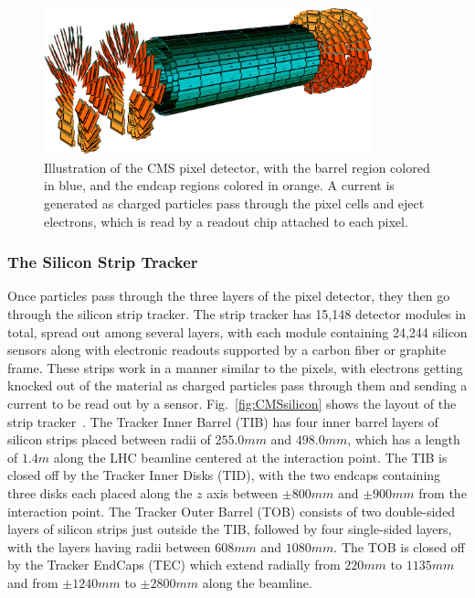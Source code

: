 \begin{figure}[htbp]
  \centering
  \includegraphics[width=0.85\textwidth]{fig/experiment/cms_pixelTracker.pdf}
  \caption{
    Illustration of the CMS pixel detector, with the barrel region colored in blue, and the endcap regions colored in orange.
    A current is generated as charged particles pass through the pixel cells and eject electrons, which is read by a readout chip attached to each pixel.
  }
  \label{fig:CMSpixel}
\end{figure}

\subsubsection{The Silicon Strip Tracker}

Once particles pass through the three layers of the pixel detector, they then go through the silicon strip tracker.
The strip tracker has 15,148 detector modules in total, spread out among several layers, with each module containing 24,244 silicon sensors along with electronic readouts supported by a carbon fiber or graphite frame. %
These strips work in a manner similar to the pixels, with electrons getting knocked out of the material as charged particles pass through them and sending a current to be read out by a sensor.
Fig.~\ref{fig:CMSsilicon} shows the layout of the strip tracker~\cite{Chatrchyan:1211825}.
The Tracker Inner Barrel (TIB) has four inner barrel layers of silicon strips placed between radii of $255.0\unit{mm}$ and $498.0\unit{mm}$, which has a length of $1.4\unit{m}$ along the LHC beamline centered at the interaction point.
The TIB is closed off by the Tracker Inner Disks (TID), with the two endcaps containing three disks each placed along the $z$ axis between $\pm800\unit{mm}$ and $\pm900\unit{mm}$ from the interaction point.
The Tracker Outer Barrel (TOB) consists of two double-sided layers of silicon strips just outside the TIB, followed by four single-sided layers, with the layers having radii between $608\unit{mm}$ and $1080\unit{mm}$.
The TOB is closed off by the Tracker EndCaps (TEC) which extend radially from $220\unit{mm}$ to $1135\unit{mm}$ and from $\pm1240\unit{mm}$ to $\pm2800\unit{mm}$ along the beamline.

